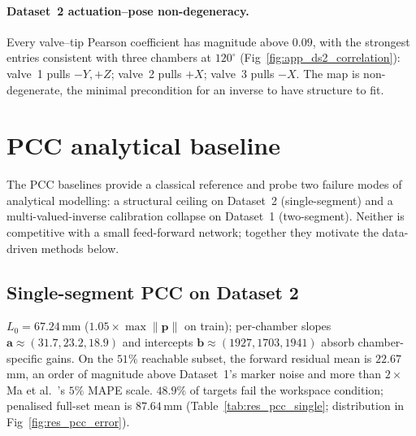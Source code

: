 \paragraph{Dataset~2 actuation--pose non-degeneracy.}
Every valve--tip Pearson coefficient has magnitude above $0.09$, with the strongest entries consistent with three chambers at $120^{\circ}$ (Fig~\ref{fig:app_ds2_correlation}): valve~1 pulls $-Y, +Z$; valve~2 pulls $+X$; valve~3 pulls $-X$. The map is non-degenerate, the minimal precondition for an inverse to have structure to fit.

\section{PCC analytical baseline}
\label{sec:res_pcc}

The PCC baselines provide a classical reference and probe two failure modes of analytical modelling: a structural ceiling on Dataset~2 (single-segment) and a multi-valued-inverse calibration collapse on Dataset~1 (two-segment). Neither is competitive with a small feed-forward network; together they motivate the data-driven methods below.

\subsection{Single-segment PCC on Dataset 2}
\label{sec:res_pcc_single}

$L_0 = 67.24$\,mm ($1.05 \times \max \|\mathbf{p}\|$ on train); per-chamber slopes $\mathbf{a} \approx (31.7, 23.2, 18.9)$ and intercepts $\mathbf{b} \approx (1927, 1703, 1941)$ absorb chamber-specific gains. On the $51\%$ reachable subset, the forward residual mean is $22.67$\,mm, an order of magnitude above Dataset~1's marker noise and more than $2\times$ Ma et al.\ \cite{ma2022bp}'s $5\%$ MAPE scale. $48.9\%$ of targets fail the workspace condition; penalised full-set mean is $87.64$\,mm (Table~\ref{tab:res_pcc_single}; distribution in Fig~\ref{fig:res_pcc_error}).

